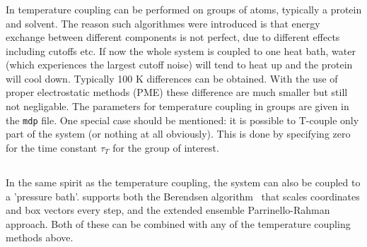 \subsubsection{}
In {\gromacs} temperature coupling can be performed on groups of
atoms, typically a protein and solvent. The reason such algorithmes
were introduced is that energy exchange between different components
is not perfect, due to different effects including cutoffs etc. If
now the whole system is coupled to one heat bath, water (which
experiences the largest cutoff noise) will tend to heat up and the
protein will cool down. Typically 100 K differences can be obtained.
With the use of proper electrostatic methods (PME) these difference
are much smaller but still not negligable. The parameters for
temperature coupling in groups are given in the {\tt mdp} file. One
special case should be mentioned: it is possible to T-couple only part
of the system (or nothing at all obviously). This is done by
specifying zero for the time constant $\tau_T$ for the group of interest.


\subsection{}
In the same spirit as the temperature coupling, the system can also be
coupled to a 'pressure bath'. 
{\gromacs} supports both the Berendsen algorithm~\cite{Berendsen84} 
that scales coordinates and box vectors every step, and the 
extended ensemble Parrinello-Rahman approach. Both of these can be
combined with any of the temperature coupling methods above.

